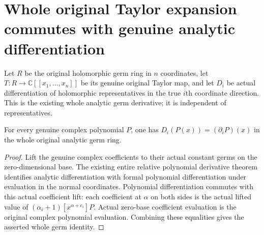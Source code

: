 \section{Whole original Taylor expansion commutes with genuine analytic differentiation}

Let $R$ be the original holomorphic germ ring in $n$ coordinates, let
$T:R\to\mathbb C[[x_1,\ldots,x_n]]$ be its genuine original Taylor map,
and let $D_i$ be actual differentiation of holomorphic representatives
in the true $i$th coordinate direction. This is the existing whole analytic
germ derivative; it is independent of representatives.

\begin{lemma}
\label{hir:actual-original-polynomial-coordinate-derivative}
\leanok
For every genuine complex polynomial $P$, one has
$D_i(P(x))=(\partial_iP)(x)$ in the whole original analytic germ ring.
\end{lemma}
\begin{proof}
Lift the genuine complex coefficients to their actual constant germs on the
zero-dimensional base. The existing entire relative polynomial derivative
theorem identifies analytic differentiation with formal polynomial
differentiation under evaluation in the normal coordinates. Polynomial
differentiation commutes with this actual coefficient lift: each coefficient
at $\alpha$ on both sides is the actual lifted value of
$(\alpha_i+1)[x^{\alpha+e_i}]P$. Actual zero-base coefficient evaluation is
the original complex polynomial evaluation. Combining these equalities
gives the asserted whole germ identity.
\end{proof}

